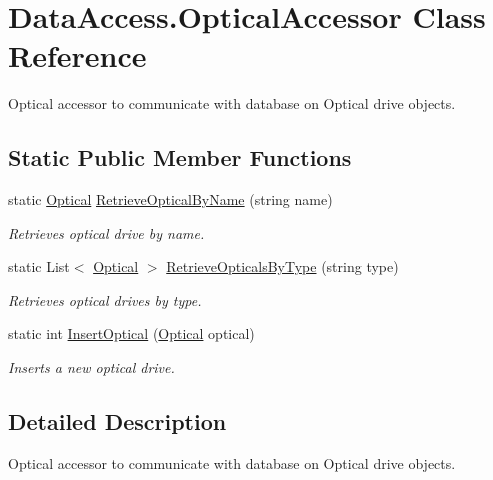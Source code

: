 \hypertarget{class_data_access_1_1_optical_accessor}{}\section{Data\+Access.\+Optical\+Accessor Class Reference}
\label{class_data_access_1_1_optical_accessor}


Optical accessor to communicate with database on Optical drive objects.  


\subsection*{Static Public Member Functions}
\begin{DoxyCompactItemize}
\item 
static \hyperlink{class_business_objects_1_1_optical}{Optical} \hyperlink{class_data_access_1_1_optical_accessor_ac26fe61270034ab1ca7d39cc898758ad}{Retrieve\+Optical\+By\+Name} (string name)
\begin{DoxyCompactList}\small\item\em Retrieves optical drive by name. \end{DoxyCompactList}\item 
static List$<$ \hyperlink{class_business_objects_1_1_optical}{Optical} $>$ \hyperlink{class_data_access_1_1_optical_accessor_aec2da606590647ae3e6c6b80e6f920f2}{Retrieve\+Opticals\+By\+Type} (string type)
\begin{DoxyCompactList}\small\item\em Retrieves optical drives by type. \end{DoxyCompactList}\item 
static int \hyperlink{class_data_access_1_1_optical_accessor_aa2e6060824ca3ba994c360fc6918f3d4}{Insert\+Optical} (\hyperlink{class_business_objects_1_1_optical}{Optical} optical)
\begin{DoxyCompactList}\small\item\em Inserts a new optical drive. \end{DoxyCompactList}\end{DoxyCompactItemize}


\subsection{Detailed Description}
Optical accessor to communicate with database on Optical drive objects. 



